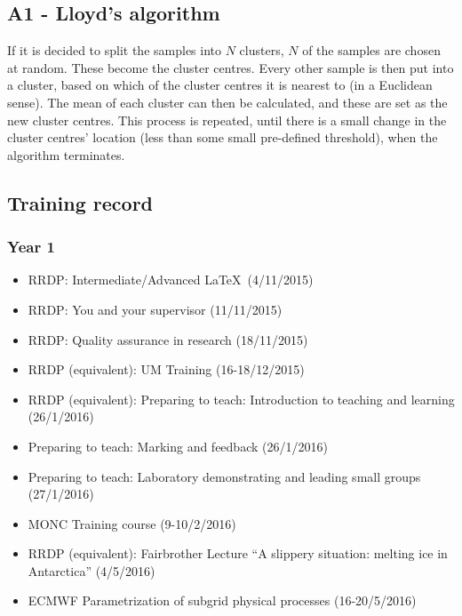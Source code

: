 \documentclass[11pt,a4paper]{article}
\begin{document}
\subsection*{A1 - Lloyd's algorithm}

If it is decided to split the samples into $N$ clusters, $N$ of the samples are chosen at random. These become the cluster centres. Every other sample is then put into a cluster, based on which of the cluster centres it is nearest to (in a Euclidean sense). The mean of each cluster can then be calculated, and these are set as the new cluster centres. This process is repeated, until there is a small change in the cluster centres' location (less than some small pre-defined threshold), when the algorithm terminates.

%

\subsection*{Training record}
\subsubsection*{Year 1}

\begin{itemize}
  \item RRDP: Intermediate/Advanced \LaTeX\ (4/11/2015)
  \item RRDP: You and your supervisor (11/11/2015)
  \item RRDP: Quality assurance in research (18/11/2015)
  \item RRDP (equivalent): UM Training (16-18/12/2015)
  \item RRDP (equivalent): Preparing to teach: Introduction to teaching and learning (26/1/2016)
  \item Preparing to teach: Marking and feedback (26/1/2016)
  \item Preparing to teach: Laboratory demonstrating and leading small groups (27/1/2016)
  \item MONC Training course (9-10/2/2016)
  \item RRDP (equivalent): Fairbrother Lecture ``A slippery situation: melting ice in Antarctica'' (4/5/2016)
  \item ECMWF Parametrization of subgrid physical processes (16-20/5/2016)
\end{itemize}
\end{document}

